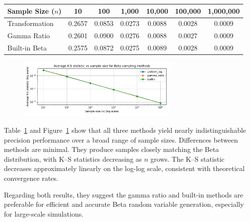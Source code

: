 \begin{table}[H]
\centering
\footnotesize
{}
\label{tab:ks}
\begin{tabular}{lcccccc}
\hline
Sample Size (\(n\)) & 10 & 100 & 1,000 & 10,000 & 100,000 & 1,000,000 \\
\hline
Transformation & 0.2657 & 0.0853 & 0.0273 & 0.0088 & 0.0028 & 0.0009 \\
Gamma Ratio    & 0.2601 & 0.0900 & 0.0276 & 0.0088 & 0.0027 & 0.0009 \\
Built-in Beta  & 0.2575 & 0.0872 & 0.0275 & 0.0089 & 0.0028 & 0.0009 \\
\hline
\end{tabular}
\end{table}

\begin{figure}[H]
    \centering
    \includegraphics[width=0.7\textwidth]{resources/figures/q6-beta_sampling_methods_ks_statistic.pdf}
    \label{fig:ks_stat_comparison}
\end{figure}

Table~\ref{tab:ks} and Figure~\ref{fig:ks_stat_comparison} show that all three methods yield nearly indistinguishable precision performance over a broad range of sample sizes. Differences between methods are minimal. They produce samples closely matching the Beta distribution, with K–S statistics decreasing as \(n\) grows. The K–S statistic decreases approximately linearly on the log-log scale, consistent with theoretical convergence rates.

Regarding both results, they suggest the gamma ratio and built-in methods are preferable for efficient and accurate Beta random variable generation, especially for large-scale simulations.




